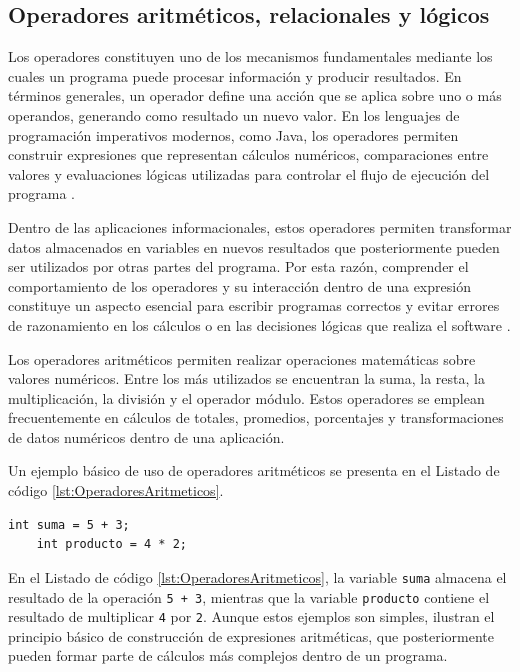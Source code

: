 \documentclass[12pt,twoside]{book}
\begin{document}
				\subsection{Operadores aritméticos, relacionales y lógicos}
					\noindent
					Los operadores constituyen uno de los mecanismos fundamentales mediante los cuales un programa puede procesar información y producir resultados. En términos generales, un operador define una acción que se aplica sobre uno o más operandos, generando como resultado un nuevo valor. En los lenguajes de programación imperativos modernos, como Java, los operadores permiten construir expresiones que representan cálculos numéricos, comparaciones entre valores y evaluaciones lógicas utilizadas para controlar el flujo de ejecución del programa \cite{Sebesta2018Concepts,Pierce2002Types}.
					
					Dentro de las aplicaciones informacionales, estos operadores permiten transformar datos almacenados en variables en nuevos resultados que posteriormente pueden ser utilizados por otras partes del programa. Por esta razón, comprender el comportamiento de los operadores y su interacción dentro de una expresión constituye un aspecto esencial para escribir programas correctos y evitar errores de razonamiento en los cálculos o en las decisiones lógicas que realiza el software \cite{Pressman2019Software,Sommerville2015Software}.
					
					\noindent
					Los operadores aritméticos permiten realizar operaciones matemáticas sobre valores numéricos. Entre los más utilizados se encuentran la suma, la resta, la multiplicación, la división y el operador módulo. Estos operadores se emplean frecuentemente en cálculos de totales, promedios, porcentajes y transformaciones de datos numéricos dentro de una aplicación.
					
					Un ejemplo básico de uso de operadores aritméticos se presenta en el Listado de código \ref{lst:OperadoresAritmeticos}.
					
					\begin{lstlisting}[style=Java,caption={Uso de operadores aritméticos en Java.},label={lst:OperadoresAritmeticos}]
	int suma = 5 + 3;
	int producto = 4 * 2; \end{lstlisting}
					
					\noindent
					En el Listado de código \ref{lst:OperadoresAritmeticos}, la variable \texttt{suma} almacena el resultado de la operación \texttt{5 + 3}, mientras que la variable \texttt{producto} contiene el resultado de multiplicar \texttt{4} por \texttt{2}. Aunque estos ejemplos son simples, ilustran el principio básico de construcción de expresiones aritméticas, que posteriormente pueden formar parte de cálculos más complejos dentro de un programa.
					
\end{document}
